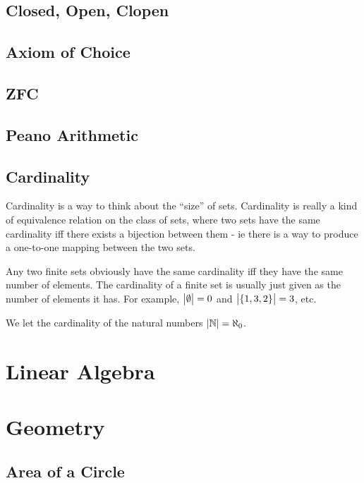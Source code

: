 \documentclass[a4paper,11pt]{article}
\begin{document}
    \subsection{Closed, Open, Clopen}

    \subsection{Axiom of Choice}

    \subsection{ZFC}

    \subsection{Peano Arithmetic}

    \subsection{Cardinality}


    Cardinality is a way to think about the ``size'' of sets. Cardinality is
    really a kind of equivalence relation on the class of sets, where two sets
    have the same cardinality iff there exists a bijection between them - ie
    there is a way to produce a one-to-one mapping between the two sets.

    Any two finite sets obviously have the same cardinality iff they have the
    same number of elements. The cardinality of a finite set is usually just
    given as the number of elements it has. For example, $\abs{\emptyset} = 0$
    and $\abs{\set{1, 3, 2}} = 3$, etc.

    We let the cardinality of the natural numbers $\abs{\mathbb{N}} = \aleph_0$.

    \section{Linear Algebra}

    \section{Geometry}

    \subsection{Area of a Circle}
\end{document}
